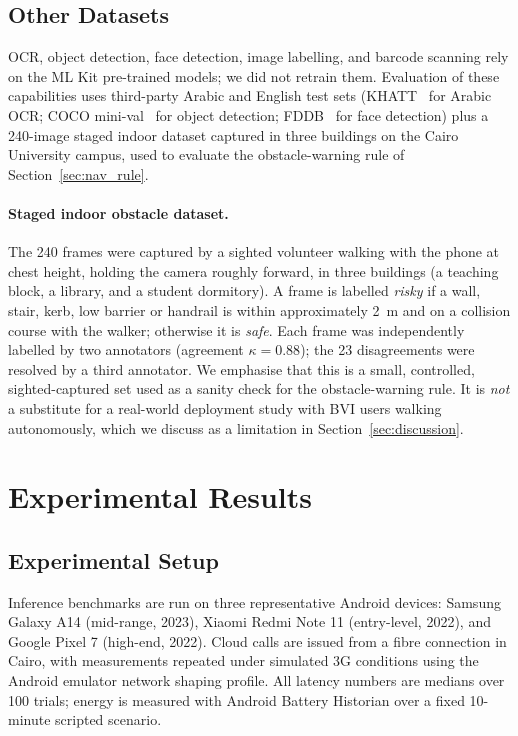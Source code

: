 \documentclass[11pt,a4paper]{article}
\begin{document}
\subsection{Other Datasets}

OCR, object detection, face detection, image labelling, and barcode
scanning rely on the ML Kit pre-trained models; we did not retrain them.
Evaluation of these capabilities uses third-party Arabic and English
test sets (KHATT~\cite{khatt} for Arabic OCR; COCO
mini-val~\cite{coco_dataset} for object
detection; FDDB~\cite{fddb_dataset} for face detection) plus a 240-image
staged indoor dataset captured in three buildings on the Cairo
University campus, used to evaluate the obstacle-warning rule of
Section~\ref{sec:nav_rule}.

\paragraph{Staged indoor obstacle dataset.}
The 240 frames were captured by a sighted volunteer walking with the
phone at chest height, holding the camera roughly forward, in three
buildings (a teaching block, a library, and a student dormitory).
A frame is labelled \emph{risky} if a wall, stair, kerb, low barrier
or handrail is within approximately 2~m and on a collision course with
the walker; otherwise it is \emph{safe}. Each frame was independently
labelled by two annotators (agreement $\kappa = 0.88$); the 23
disagreements were resolved by a third annotator. We emphasise that
this is a small, controlled, sighted-captured set used as a sanity
check for the obstacle-warning rule. It is \emph{not} a substitute
for a real-world deployment study with BVI users walking
autonomously, which we discuss as a limitation in
Section~\ref{sec:discussion}.

\section{Experimental Results}
\label{sec:results}

\subsection{Experimental Setup}

Inference benchmarks are run on three representative Android devices:
Samsung Galaxy A14 (mid-range, 2023), Xiaomi Redmi Note 11 (entry-level,
2022), and Google Pixel 7 (high-end, 2022). Cloud calls are issued from a
fibre connection in Cairo, with measurements repeated under simulated 3G
conditions using the Android emulator network shaping profile. All
latency numbers are medians over 100 trials; energy is measured with
Android Battery Historian over a fixed 10-minute scripted scenario.
\end{document}
